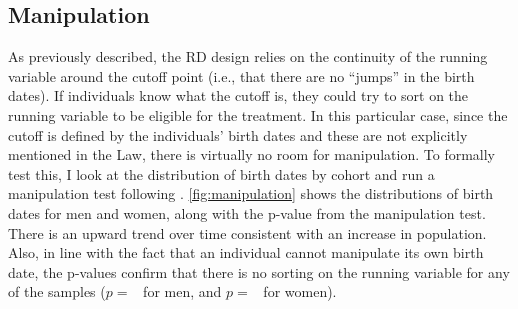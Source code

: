\documentclass[12pt, a4paper]{article}
\begin{document}
\subsection{Manipulation}
As previously described, the RD design relies on the continuity of the running variable around the cutoff point (i.e., that there are no ``jumps'' in the birth dates). If individuals know what the cutoff is, they could try to sort on the running variable to be eligible for the treatment. In this particular case, since the cutoff is defined by the individuals' birth dates and these are not explicitly mentioned in the Law, there is virtually no room for manipulation. To formally test this, I look at the distribution of birth dates by cohort and run a manipulation test following \citet{mccrary2008manipulation}. \autoref{fig:manipulation} shows the distributions of birth dates for men and women, along with the p-value from the manipulation test. There is an upward trend over time consistent with an increase in population. Also, in line with the fact that an individual cannot manipulate its own birth date, the p-values confirm that there is no sorting on the running variable for any of the samples ($p=$ \pvalMw\ for men, and $p=$ \pvalFw\ for women).
\end{document}
